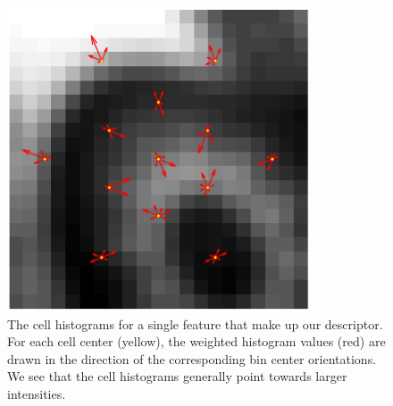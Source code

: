 \documentclass[thesis.tex]{subfiles}
\begin{document}
\begin{figure}[tb]
    \centering
    \includegraphics[width=0.8\textwidth]{img/cellHistFigure.pdf}
    \caption{The cell histograms for a single feature that make up our descriptor. For each cell center (yellow), the weighted histogram values (red) are drawn in the direction of the corresponding bin center orientations. We see that the cell histograms generally point towards larger intensities.}
    \label{fig:cellHistFigure}
\end{figure}
%
%
%
\end{document}
